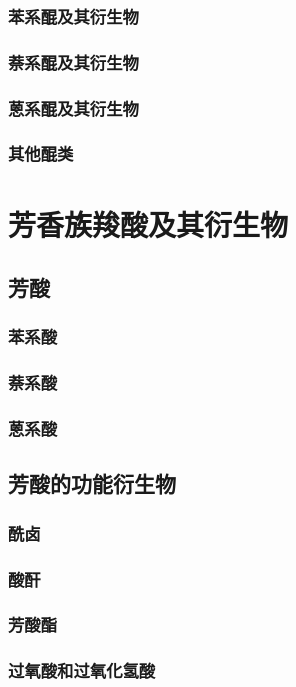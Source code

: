 \documentclass[UTF8]{../03-Chemistry}
\begin{document}
        \subsubsection{苯系醌及其衍生物}
        \subsubsection{萘系醌及其衍生物}
        \subsubsection{蒽系醌及其衍生物}
        \subsubsection{其他醌类}
\section{芳香族羧酸及其衍生物}
    \subsection{芳酸}
        \subsubsection{苯系酸}
        \subsubsection{萘系酸}
        \subsubsection{蒽系酸}
    \subsection{芳酸的功能衍生物}
        \subsubsection{酰卤}
        \subsubsection{酸酐}
        \subsubsection{芳酸酯}
        \subsubsection{过氧酸和过氧化氢酸}
\end{document}
